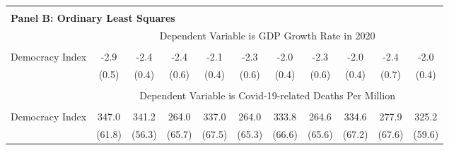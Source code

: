 \begin{table}[!htbp]
\begin{threeparttable}
\begin{tabular}{@{\extracolsep{0pt}}lcccccccccc}
 \hline \\[-1.8ex] 

\multicolumn{11}{l}{\textbf{Panel B: Ordinary Least Squares}} \\ 
 & \multicolumn{10}{c}{Dependent Variable is GDP Growth Rate in 2020} \\ 
\cline{2-11}  \\[-1.8ex] 

Democracy Index &     -2.9\sym{***}&     -2.4\sym{***}&     -2.4\sym{***}&     -2.1\sym{***}&     -2.3\sym{***}&     -2.0\sym{***}&     -2.3\sym{***}&     -2.0\sym{***}&     -2.4\sym{***}&     -2.0\sym{***}\\
                &    (0.5)         &    (0.4)         &    (0.6)         &    (0.4)         &    (0.6)         &    (0.4)         &    (0.6)         &    (0.4)         &    (0.7)         &    (0.4)         \\
  \\

& \multicolumn{10}{c}{Dependent Variable is Covid-19-related Deaths Per Million} \\ 
\cline{2-11}  \\[-1.8ex]

Democracy Index &    347.0\sym{***}&    341.2\sym{***}&    264.0\sym{***}&    337.0\sym{***}&    264.0\sym{***}&    333.8\sym{***}&    264.6\sym{***}&    334.6\sym{***}&    277.9\sym{***}&    325.2\sym{***}\\
                &   (61.8)         &   (56.3)         &   (65.7)         &   (67.5)         &   (65.3)         &   (66.6)         &   (65.6)         &   (67.2)         &   (67.6)         &   (59.6)         \\


\end{tabular}
\end{threeparttable}
\end{table}
